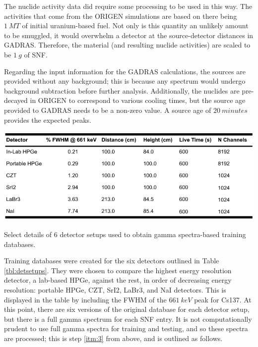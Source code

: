 The nuclide activity data did require some processing to be used in this way.
The activities that come from the \gls{ORIGEN} simulations are based on there
being $1\:MT$ of initial uranium-based fuel. Not only is this quantity an
unlikely amount to be smuggled, it would overwhelm a detector at the
 source-detector distances in \gls{GADRAS}. Therefore, the material (and
resulting nuclide activities) are scaled to be $1\:g$ of \gls{SNF}.

Regarding the input information for the \gls{GADRAS} calculations, the sources
are provided without any background; this is because any spectrum would undergo
background subtraction before further analysis. Additionally, the nuclides are
pre-decayed in \gls{ORIGEN} to correspond to various cooling times, but the
source age provided to \gls{GADRAS} needs to be a non-zero value. A source age
of $20\:minutes$ provides the expected peaks.

\begin{table}[!htb]
  \centering
  \includegraphics[width=\linewidth]{./chapters/method/gadras_detectors.png}
  \caption{Select details of 6 detector setups used to obtain gamma 
           spectra-based training databases.}
  \label{tbl:detsetups}
\end{table}

Training databases were created for the six detectors outlined in Table
\ref{tbl:detsetups}. They were chosen to compare the highest energy resolution
detector, a lab-based \gls{HPGe}, against the rest, in order of decreasing
energy resolution: portable \gls{HPGe}, \gls{CZT}, \gls{SrI2}, \gls{LaBr3}, and
\gls{NaI} detectors. This is displayed in the table by including the \gls{FWHM}
of the $661\:keV$ peak for Cs137. At this point, there are six versions of the
original database for each detector setup, but there is a full gamma spectrum
for each \gls{SNF} entry. It is not computationally prudent to use full gamma
spectra for training and testing, and so these spectra are processed; this is
step \ref{itm:3} from above, and is outlined as follows.

